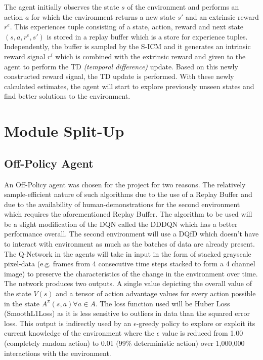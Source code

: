 \documentclass[12pt,a4paper]{article}
\begin{document}
The agent initially observes the state $s$ of the environment and performs an action $a$ 
for which the environment returns a new state $s'$ and an extrinsic reward $r^e$. This experiences
tuple consisting of a state, action, reward and next state  $(s, a, r^e, s')$ is stored in a 
replay buffer which is a store for experience tuples. Independently, the buffer is sampled 
by the S-ICM and it generates an intrinsic reward signal $r^i$ which is combined with the extrinsic reward and given to the agent to perform the TD \textit{(temporal difference)} update.
Based on this newly constructed reward signal, the TD update is performed. With these newly calculated
estimates, the agent will start to explore previously unseen states and find better 
solutions to the environment.

\section{Module Split-Up}

\subsection{Off-Policy Agent}
An Off-Policy agent was chosen for the project for two reasons. The relatively sample-efficient
nature of such algorithms due to the use of a Replay Buffer and due to the availability of 
human-demonstrations for the second environment which requires the aforementioned Replay Buffer.
The algorithm to be used will be a slight modification of the DQN called the DDDQN which has a 
better performance overall. The second environment will use a DQfD which doesn't have to interact with environment
as much as the batches of data are already present. The Q-Network in the agents will take in input in the 
form of stacked grayscale pixel-data (e.g. frames from 4 consecutive time steps stacked to form a 4 channel image) 
to preserve the characteristics of the change in the environment over time. The network produces two outputs. A single
value depicting the overall value of the state $V(s)$ and a tensor of action advantage values for every action possible in the state $A^\pi(s,a) \forall a \in A$. The loss function used will be Huber Loss (SmoothL1Loss) as it is less sensitive to outliers in data than the squared error loss. This output is indirectly used by an $\epsilon$-greedy policy to explore or exploit its current knowledge of the environment where the $\epsilon$ value
is reduced from 1.00 (completely random action) to 0.01 (99\% deterministic action) over 1,000,000
interactions with the environment.
\end{document}
